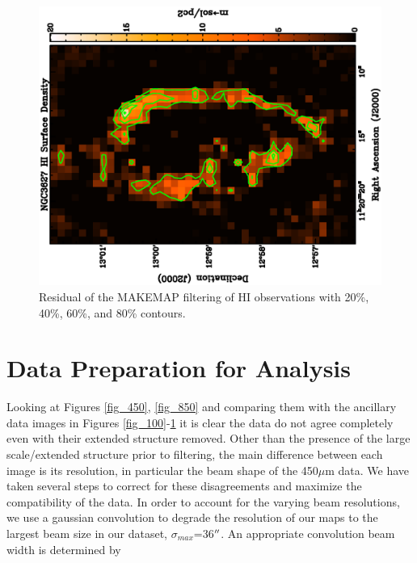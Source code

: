 \begin{figure}
  \centering
  \includegraphics[width=1.\textwidth,angle=270]{obs_imgs/HI_rem.eps}
  \caption[NGC3627 HI Observations]{Residual of the MAKEMAP filtering of HI observations with 20\%, 40\%, 60\%, and 80\% contours.}
  \label{fig_HI}
\end{figure}


\section{Data Preparation for Analysis}\label{data_agree}

Looking at Figures \ref{fig_450}, \ref{fig_850} and comparing them with the ancillary data images in Figures \ref{fig_100}-\ref{fig_HI} it is clear the data do not agree completely even with their extended structure removed.  Other than the presence of the large scale/extended structure prior to filtering, the main difference between each image is its resolution, in particular the beam shape of the 450$\mu$m data.  We have taken several steps to correct for these disagreements and maximize the compatibility of the data.  In order to account for the varying beam resolutions, we use a gaussian convolution to degrade the resolution of our maps to the largest beam size in our dataset, $\sigma_{max}$=36$\mbox{$^{\prime\prime}$}$.  An appropriate convolution beam width is determined by 

